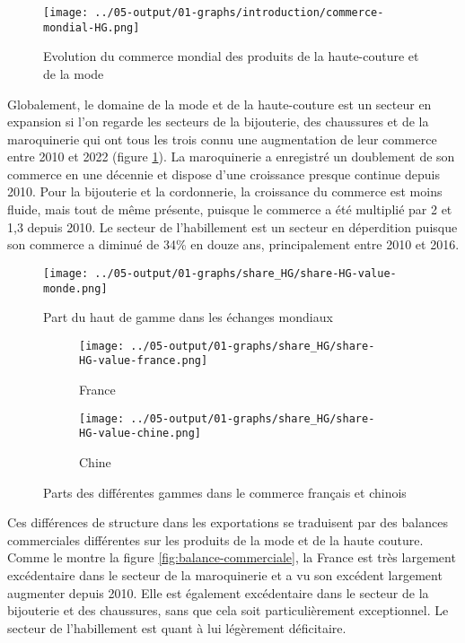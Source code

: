 \documentclass[french,10pt,a4paper]{article}
\begin{document}
\begin{figure}[!h]
  \centering
  \texttt{[image: ../05-output/01-graphs/introduction/commerce-mondial-HG.png]}
  \caption{Evolution du commerce mondial des produits de la haute-couture et de la mode}
  \label{fig:commerce-mondial-HG}
\end{figure}

Globalement, le domaine de la mode et de la haute-couture est un secteur en expansion si l'on regarde les secteurs de la bijouterie, des chaussures et de la maroquinerie qui ont tous les trois connu une augmentation de leur commerce entre 2010 et 2022 (figure \ref{fig:commerce-mondial-HG}). La maroquinerie a enregistré un doublement de son commerce en une décennie et dispose d'une croissance presque continue depuis 2010. Pour la bijouterie et la cordonnerie, la croissance du commerce est moins fluide, mais tout de même présente, puisque le commerce a été multiplié par 2 et 1,3 depuis 2010. Le secteur de l'habillement est un secteur en déperdition puisque son commerce a diminué de 34\% en douze ans, principalement entre 2010 et 2016. 

\begin{figure}[!h]
  \centering
  \texttt{[image: ../05-output/01-graphs/share\_HG/share-HG-value-monde.png]}
  \caption{Part du haut de gamme dans les échanges mondiaux}
  \label{fig:share-HG-value-monde}
\end{figure}


\begin{figure}[!h]
  \centering
  \begin{subfigure}{\textwidth}
    \centering    
    \texttt{[image: ../05-output/01-graphs/share\_HG/share-HG-value-france.png]}
    \caption{France}
    \label{fig:share-HG-value-france}
  \end{subfigure}
  \vspace{0.5cm}
  \begin{subfigure}{\textwidth}
    \centering
 \texttt{[image: ../05-output/01-graphs/share\_HG/share-HG-value-chine.png]}
 \caption{Chine}
 \label{fig:share-HG-value-chine}
  \end{subfigure}
  \caption{Parts des différentes gammes dans le commerce français et chinois}
  \label{fig:share-HG-value-france-chine}
\end{figure}

Ces différences de structure dans les exportations se traduisent par des balances commerciales différentes sur les produits de la mode et de la haute couture. Comme le montre la figure \ref{fig:balance-commerciale}, la France est très largement excédentaire dans le secteur de la maroquinerie et a vu son excédent largement augmenter depuis 2010. Elle est également excédentaire dans le secteur de la bijouterie et des chaussures, sans que cela soit particulièrement exceptionnel. Le secteur de l'habillement est quant à lui légèrement déficitaire.
\end{document}

